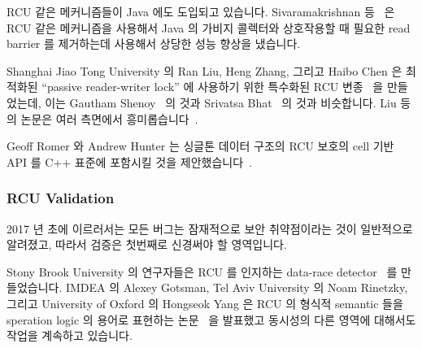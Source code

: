 RCU 같은 메커니즘들이 Java 에도 도입되고 있습니다.
Sivaramakrishnan 등~\cite{Sivaramakrishnan:2012:ERB:2258996.2259005} 은 RCU
같은 메커니즘을 사용해서 Java 의 가비지 콜렉터와 상호작용할 때 필요한 read
barrier 를 제거하는데 사용해서 상당한 성능 향상을 냈습니다.

Shanghai Jiao Tong University 의 Ran Liu, Heng Zhang, 그리고 Haibo Chen 은
최적화된 ``passive reader-writer lock'' 에 사용하기 위한 특수화된 RCU
변종~\cite{RanLiu2014PassiveRWLock} 을 만들었는데, 이는 Gautham
Shenoy~\cite{GauthamShenoy2006RCUrwlock} 의 것과 Srivatsa
Bhat~\cite{SrivatsaSBhat2014RCUrwlock} 의 것과 비슷합니다.
Liu 등의 논문은 여러 측면에서 흥미롭습니다~\cite{PaulEMcKenney2014ReadMostly}.

Geoff Romer 와 Andrew Hunter 는 싱글톤 데이터 구조의 RCU 보호의 cell 기반 API
를 C++ 표준에 포함시킬 것을
제안했습니다~\cite{GeoffRomer2017C++DeferredReclamation}.
\iffalse

RCU-like mechanisms are also finding their way into Java.
Sivaramakrishnan et al.~\cite{Sivaramakrishnan:2012:ERB:2258996.2259005}
use an RCU-like mechanism to eliminate the read barriers that are
otherwise required when interacting with Java's garbage collector,
resulting in significant performance improvements.

Ran Liu, Heng Zhang, and Haibo Chen of Shanghai Jiao Tong University
created a specialized variant of RCU that they used for an optimized
``passive reader-writer lock''~\cite{RanLiu2014PassiveRWLock}, similar to
those created by Gautham Shenoy~\cite{GauthamShenoy2006RCUrwlock} and
Srivatsa Bhat~\cite{SrivatsaSBhat2014RCUrwlock}.
The Liu et al.~paper is interesting from a number of
perspectives~\cite{PaulEMcKenney2014ReadMostly}.

Geoff Romer and Andrew Hunter proposed a cell-based API for RCU
protection of singleton data structures for inclusion in the
C++ standard~\cite{GeoffRomer2017C++DeferredReclamation}.
\fi

\subsubsection{RCU Validation}
\label{sec:defer:RCU Validation}

2017 년 초에 이르러서는 모든 버그는 잠재적으로 보안 취약점이라는 것이
일반적으로 알려졌고, 따라서 검증은 첫번째로 신경써야 할 영역입니다.

Stony Brook University 의 연구자들은 RCU 를 인지하는 data-race
detector~\cite{AbhinavDuggal2010Masters,JustinSeyster2012PhD,Seyster:2011:RFA:2075416.2075425}
를 만들었습니다.
IMDEA 의 Alexey Gotsman, Tel Aviv University 의 Noam Rinetzky, 그리고
University of Oxford 의 Hongseok Yang 은 RCU 의 형식적 semantic 들을 speration
logic 의 용어로 표현하는 논문~\cite{AlexeyGotsman2012VerifyGraceExtended} 을
발표했고 동시성의 다른 영역에 대해서도 작업을 계속하고 있습니다.

